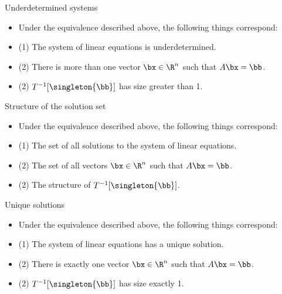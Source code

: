 \documentclass{beamer}
\begin{document}

\begin{frame}{Underdetermined systems}

\begin{itemize}
\item Under the equivalence described above, the following things correspond:
\item (1) The system of linear equations is underdetermined.
\item (2) There is more than one vector $\bx \in \R^n$ such that $A \bx = \bb$.
\item (2) $T^{-1}[\singleton{\bb}]$ has size greater than 1.
\end{itemize}

\end{frame}


\begin{frame}{Structure of the solution set}

\begin{itemize}
\item Under the equivalence described above, the following things correspond:
\item (1) The set of all solutions to the system of linear equations.
\item (2) The set of all vectors $\bx \in \R^n$ such that $A \bx = \bb$.
\item (2) The structure of $T^{-1}[\singleton{\bb}]$.
\end{itemize}

\end{frame}


\begin{frame}{Unique solutions}

\begin{itemize}
\item Under the equivalence described above, the following things correspond:
\item (1) The system of linear equations has a unique solution.
\item (2) There is exactly one vector $\bx \in \R^n$ such that $A \bx = \bb$.
\item (2) $T^{-1}[\singleton{\bb}]$ has size exactly 1.
\end{itemize}

\end{frame}
\end{document}
